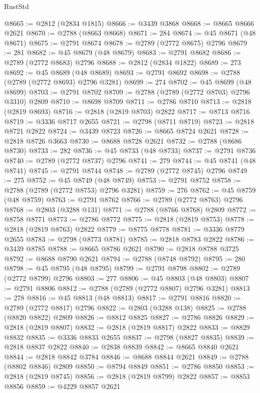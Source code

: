 \begin{lexlean}{RustStd}
\begin{coremodule}
@8665 := @2812 (@2834 @1815)
@8666 := @3439 @3868
@8668 := @8665 @8666 @2621
@8670 := @2788 (@8663 @8668)
@8671 := 284
@8674 := @45 @8671 (@48 @8671)
@8675 := @2791 @8674
@8678 := @2789 (@2772 @8675) @2796
@8679 := 281
@8682 := @45 @8679 (@48 @8679)
@8683 := @2791 @8682
@8686 := @2789 (@2772 @8683) @2796
@8688 := @2812 (@2834 @1822)
@8689 := 273
@8692 := @45 @8689 (@48 @8689)
@8693 := @2791 @8692
@8698 := @2788 (@2789 (@2772 @8693) @2796 @3281)
@8699 := 274
@8702 := @45 @8699 (@48 @8699)
@8703 := @2791 @8702
@8709 := @2788 (@2789 (@2772 @8703) @2796 @3310) @2809
@8710 := @8698 @8709
@8711 := @2786 @8710
@8713 := @2818 (@2819 @8693)
@8716 := @2818 (@2819 @8703) @2822
@8717 := @8713 @8716
@8719 := @3336 @8717 @2655
@8721 := @2798 (@8711 @8719)
@8723 := @2818 @8721 @2822
@8724 := @3439 @8723
@8726 := @8665 @8724 @2621
@8728 := @2818 @8726 @3663
@8730 := @8688 @8728 @2621
@8732 := @2788 (@8686 @8730)
@8733 := 282
@8736 := @45 @8733 (@48 @8733)
@8737 := @2791 @8736
@8740 := @2789 (@2772 @8737) @2796
@8741 := 279
@8744 := @45 @8741 (@48 @8741)
@8745 := @2791 @8744
@8748 := @2789 (@2772 @8745) @2796
@8749 := 275
@8752 := @45 @8749 (@48 @8749)
@8753 := @2791 @8752
@8758 := @2788 (@2789 (@2772 @8753) @2796 @3281)
@8759 := 276
@8762 := @45 @8759 (@48 @8759)
@8763 := @2791 @8762
@8766 := @2789 (@2772 @8763) @2796
@8768 := @2803 (@3288 @131)
@8771 := @2788 (@8766 @8768) @2809
@8772 := @8758 @8771
@8773 := @2786 @8772
@8775 := @2818 (@2819 @8753)
@8778 := @2818 (@2819 @8763) @2822
@8779 := @8775 @8778
@8781 := @3336 @8779 @2655
@8783 := @2798 (@8773 @8781)
@8785 := @2818 @8783 @2822
@8786 := @3439 @8785
@8788 := @8665 @8786 @2621
@8790 := @2818 @8788 @3725
@8792 := @8688 @8790 @2621
@8794 := @2788 (@8748 @8792)
@8795 := 280
@8798 := @45 @8795 (@48 @8795)
@8799 := @2791 @8798
@8802 := @2789 (@2772 @8799) @2796
@8803 := 277
@8806 := @45 @8803 (@48 @8803)
@8807 := @2791 @8806
@8812 := @2788 (@2789 (@2772 @8807) @2796 @3281)
@8813 := 278
@8816 := @45 @8813 (@48 @8813)
@8817 := @2791 @8816
@8820 := @2789 (@2772 @8817) @2796
@8822 := @2803 (@3288 @138)
@8825 := @2788 (@8820 @8822) @2809
@8826 := @8812 @8825
@8827 := @2786 @8826
@8829 := @2818 (@2819 @8807)
@8832 := @2818 (@2819 @8817) @2822
@8833 := @8829 @8832
@8835 := @3336 @8833 @2655
@8837 := @2798 (@8827 @8835)
@8839 := @2818 @8837 @2822
@8840 := @2838 @8839
@8842 := @8665 @8840 @2621
@8844 := @2818 @8842 @3784
@8846 := @8688 @8844 @2621
@8849 := @2788 (@8802 @8846) @2809
@8850 := @8794 @8849
@8851 := @2786 @8850
@8853 := @2818 (@2819 @8745)
@8856 := @2818 (@2819 @8799) @2822
@8857 := @8853 @8856
@8859 := @4229 @8857 @2621

\end{coremodule}
\end{lexlean}

